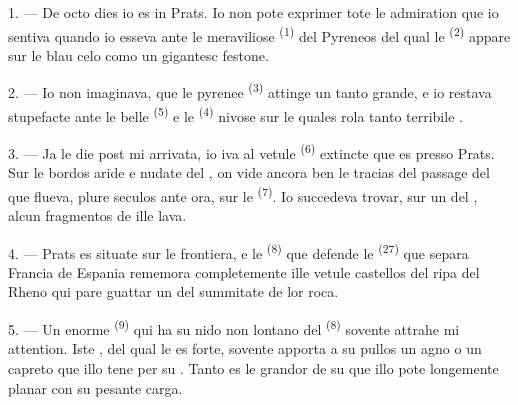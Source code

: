 
\VUsaut{4.0mm}
\VUsaut{3.0mm}

\VUsaut{3.0mm}

\VUsaut{3.0mm}

1. --- De octo dies io es in Prats. Io non pote exprimer tote le admiration que
io sentiva quando io esseva ante le meraviliose 
\textsuperscript{(1)} del Pyreneos del qual le 
\textsuperscript{(2)} appare sur le blau celo como un gigantesc festone.

2. --- Io non imaginava, que le  pyrenee
\textsuperscript{(3)} attinge un  tanto grande, e io restava
stupefacte ante le belle  \textsuperscript{(5)} e le
 \textsuperscript{(4)} nivose sur le quales rola tanto terribile
.

\VUsaut{3.0mm}
\VUsaut{3.0mm}

3. --- Ja le die post mi arrivata, io iva al vetule 
\textsuperscript{(6)} extincte que es presso Prats. Sur le bordos aride e nudate
del , on vide ancora ben le tracias del passage del 
que flueva, plure seculos ante ora, sur le 
\textsuperscript{(7)}. Io succedeva trovar, sur un del , alcun
fragmentos de ille lava.

4. --- Prats es situate sur le frontiera, e le 
\textsuperscript{(8)} que defende le  \textsuperscript{(27)} que
separa Francia de Espania rememora completemente ille vetule castellos del ripa
del Rheno qui pare guattar un  del summitate de lor roca.

5. --- Un enorme  \textsuperscript{(9)} qui ha su nido non
lontano del  \textsuperscript{(8)} sovente attrahe mi attention.
Iste , del qual le  es forte, sovente apporta a
su pullos un agno o un capreto que illo tene per su . Tanto es le
grandor de su  que illo pote longemente planar con su pesante
carga.

